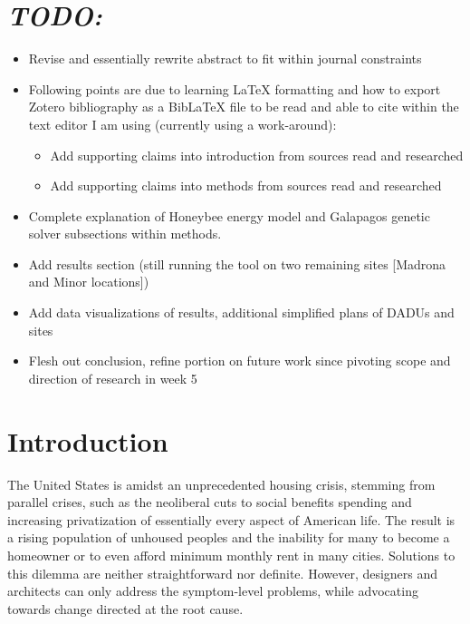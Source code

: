 \documentclass[sagev,doublespace,times,Review]{sagej}
\begin{document}
\section{\textit{TODO:}}
\begin{itemize}
	\item Revise and essentially rewrite abstract to fit within journal constraints
	\item Following points are due to learning LaTeX formatting and how to export Zotero bibliography as a BibLaTeX file to be read and able to cite within the text editor I am using (currently using a work-around): \begin{itemize} 
	\item Add supporting claims into introduction from sources read and researched
	\item Add supporting claims into methods from sources read and researched \end{itemize}
	\item Complete explanation of Honeybee energy model and Galapagos genetic solver subsections within methods.
	\item Add results section (still running the tool on two remaining sites [Madrona and Minor locations])
	\item Add data visualizations of results, additional simplified plans of DADUs and sites
	\item Flesh out conclusion, refine portion on future work since pivoting scope and direction of research in week 5
\end{itemize}

\section{Introduction}
The United States is amidst an unprecedented housing crisis, stemming from parallel crises, such as the neoliberal cuts to social benefits spending and increasing privatization of essentially every aspect of American life. The result is a rising population of unhoused peoples and the inability for many to become a homeowner or to even afford minimum monthly rent in many cities. Solutions to this dilemma are neither straightforward nor definite. However, designers and architects can only address the symptom-level problems, while advocating towards change directed at the root cause. 
\end{document}
